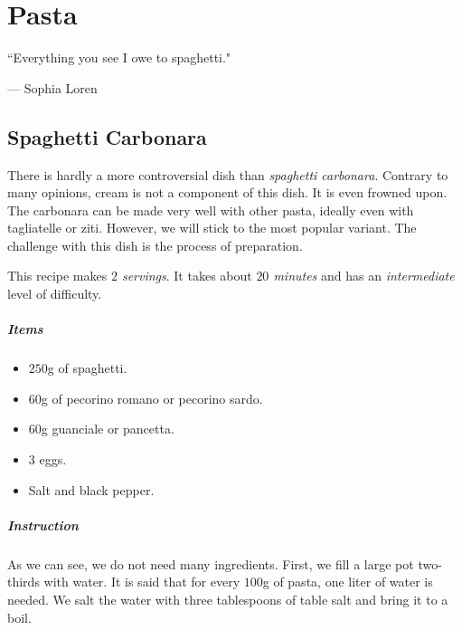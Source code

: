 \chapter{Pasta}
\label{pasta}
\epigraph{``Everything you see I owe to spaghetti."}{--- \textup{Sophia Loren}}

\section{Spaghetti Carbonara}
\label{spaghetticarbonara}
There is hardly a more controversial dish than \emph{spaghetti carbonara}. Contrary to many opinions, cream is not a component of this dish. It is even frowned upon. The carbonara can be made very well with other pasta, ideally even with tagliatelle or ziti. However, we will stick to the most popular variant. The challenge with this dish is the process of preparation.

This recipe makes \emph{$2$ servings}. It takes about \emph{$20$ minutes} and has an \emph{intermediate} level of difficulty. 

\paragraph{Items}
\begin{itemize}[noitemsep]
    \item[\ding{182}] $250$g of spaghetti.
    \item[\ding{183}] $60$g of pecorino romano or pecorino sardo.
    \item[\ding{184}] $60$g guanciale or pancetta.
    \item[\ding{185}] $3$ eggs.
    \item[\ding{186}] Salt and black pepper.
\end{itemize}

\paragraph{Instruction} 
As we can see, we do not need many ingredients. First, we fill a large pot two-thirds with water. It is said that for every $100$g of pasta, one liter of water is needed. We salt the water with three tablespoons of table salt and bring it to a boil.

